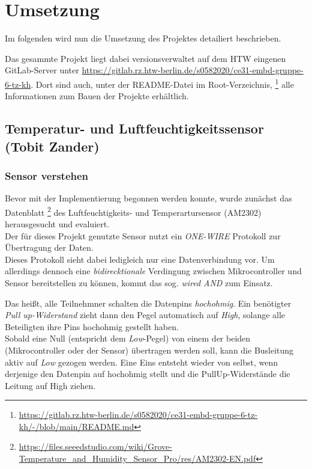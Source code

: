 \documentclass[11pt,a4paper,titlepage]{article}
\begin{document}
\newpage
\section{Umsetzung}
Im folgenden wird nun die Umsetzung des Projektes detailiert beschrieben.

Das gesammte Projekt liegt dabei versionsverwaltet auf dem HTW eingenen GitLab-Server unter
\url{https://gitlab.rz.htw-berlin.de/s0582020/ce31-embd-gruppe-6-tz-kh}.
Dort sind auch, unter der README-Datei im Root-Verzeichnis,
\footnote{\url{https://gitlab.rz.htw-berlin.de/s0582020/ce31-embd-gruppe-6-tz-kh/-/blob/main/README.md}}
alle Informationen zum Bauen der Projekte erhältlich.

\subsection{Temperatur- und Luftfeuchtigkeitssensor (Tobit Zander)}

\subsubsection{Sensor verstehen}
Bevor mit der Implementierung begonnen werden konnte, wurde zunächst das Datenblatt
\footnote{\url{https://files.seeedstudio.com/wiki/Grove-Temperature_and_Humidity_Sensor_Pro/res/AM2302-EN.pdf}}
des Luftfeuchtigkeits- und Temperartursensor (AM2302) herausgesucht und evaluiert.\\

Der für dieses Projekt genutzte Sensor nutzt ein \textit{ONE-WIRE} Protokoll zur Übertragung der Daten.\\
Dieses Protokoll sieht dabei ledigleich nur eine Datenverbindung vor.
Um allerdings dennoch eine \textit{bidirecktionale} Verdingung zwischen Mikrocontroller und Sensor bereitstellen zu können,
kommt das sog. \textit{wired AND} zum Einsatz.

Das heißt, alle Teilnehmner schalten die Datenpins \textit{hochohmig}.
Ein benötigter \textit{Pull up-Widerstand} zieht dann den Pegel automatisch auf \textit{High},
solange alle Beteiligten ihre Pins hochohmig gestellt haben.\\

Sobald eine Null (entspricht dem \textit{Low}-Pegel) von einem der beiden (Mikrocontroller oder der Sensor) übertragen werden soll,
kann die Busleitung aktiv auf \textit{Low} gezogen werden.
Eine Eins entsteht wieder von selbst,
wenn derjenige den Datenpin auf hochohmig stellt und die PullUp-Widerstände die Leitung auf High ziehen.
\end{document}
